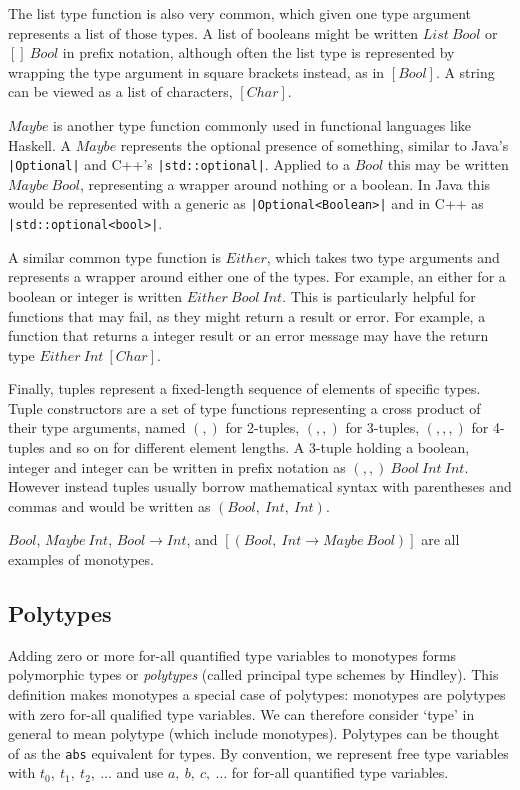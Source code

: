 \documentclass[a4paper,fleqn,oneside,12pt]{report}
\begin{document}
The list type function is also very common, which given one type argument represents a list of those types. A list of booleans might be written $List\ Bool$ or $[]\ Bool$ in prefix notation, although often the list type is represented by wrapping the type argument in square brackets instead, as in $[Bool]$. A string can be viewed as a list of characters, $[Char]$.

$Maybe$ is another type function commonly used in functional languages like Haskell. A $Maybe$ represents the optional presence of something, similar to Java’s \texttt{|Optional|} and C++’s \texttt{|std::optional|}. Applied to a $Bool$ this may be written $Maybe\ Bool$, representing a wrapper around nothing or a boolean. In Java this would be represented with a generic as \texttt{|Optional<Boolean>|} and in C++ as \texttt{|std::optional<bool>|}.

A similar common type function is $Either$, which takes two type arguments and represents a wrapper around either one of the types. For example, an either for a boolean or integer is written $Either\ Bool\ Int$. This is particularly helpful for functions that may fail, as they might return a result or error. For example, a function that returns a integer result or an error message may have the return type $Either\ Int\ [Char]$.

Finally, tuples represent a fixed-length sequence of elements of specific types. Tuple constructors are a set of type functions representing a cross product of their type arguments, named $(,)$ for 2-tuples, $(,,)$ for 3-tuples, $(,,,)$ for 4-tuples and so on for different element lengths. A 3-tuple holding a boolean, integer and integer can be written in prefix notation as $(,,)\ Bool\ Int\ Int$. However instead tuples usually borrow mathematical syntax with parentheses and commas and would be written as $(Bool,\ Int,\ Int)$.

$Bool$, $Maybe\ Int$, $Bool \rightarrow Int$, and $[(Bool,\ Int \rightarrow Maybe\ Bool)]$ are all examples of monotypes.

\subsection{Polytypes}

Adding zero or more for-all quantified type variables to monotypes forms polymorphic types or \textit{polytypes} (called principal type schemes by Hindley). This definition makes monotypes a special case of polytypes: monotypes are polytypes with zero for-all qualified type variables. We can therefore consider `type' in general to mean polytype (which include monotypes). Polytypes can be thought of as the \texttt{abs} equivalent for types. By convention, we represent free type variables with $t_0,\ t_1,\ t_2,\ \dots$ and use $a,\ b,\ c,\ \dots$ for for-all quantified type variables.
\end{document}
